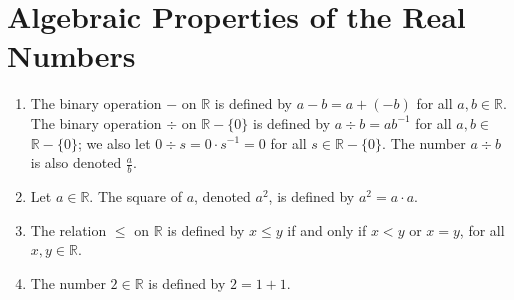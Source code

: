 \section{Algebraic Properties of the Real Numbers}
\label{rpr}

\begin{definition} %
	\hfill

	\begin{enumerate}
		\item The binary operation $-$ on $\mathbb{R}$ is defined by $a - b = a + (-b)$ for all $a, b \in \mathbb{R}$. The binary operation $\div$ on $\mathbb{R} - \{0\}$ is defined by $a \div b = a b^{-1}$ for all $a, b \in$ $\mathbb{R} - \{0\}$; we also let $0 \div s = 0 \cdot s^{-1} = 0$ for all $s \in \mathbb{R} - \{0\}$. The number $a \div b$ is also denoted $\frac{a}{b}$.
		\item Let $a \in \mathbb{R}$. The square of $a$, denoted $a^{2}$, is defined by $a^{2} = a \cdot a$.
		\item The relation $\leq$ on $\mathbb{R}$ is defined by $x \leq y$ if and only if $x < y$ or $x = y$, for all $x, y \in \mathbb{R}$.
		\item The number $2 \in \mathbb{R}$ is defined by $2 = 1 + 1$.
	\end{enumerate}
\end{definition}


